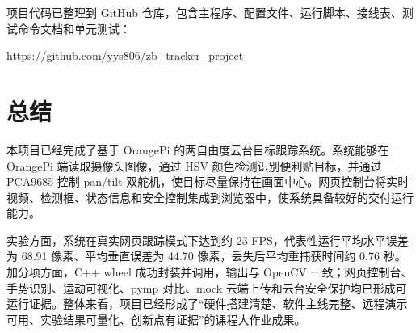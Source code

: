 \documentclass[
  oneside,
  degree=bachelor,
  field=science,
  fullwidthstop=circle,
  fontset=windows,
  times=false,
  minted=false,
  biblatex=false,
  algo=algpseudocode,
]{tongjithesis}
\begin{document}
项目代码已整理到 GitHub 仓库，包含主程序、配置文件、运行脚本、接线表、测试命令文档和单元测试：

\begin{center}
  \url{https://github.com/yys806/zb_tracker_project}
\end{center}

\chapter{总结}

本项目已经完成了基于 OrangePi 的两自由度云台目标跟踪系统。系统能够在 OrangePi 端读取摄像头图像，通过 HSV 颜色检测识别便利贴目标，并通过 PCA9685 控制 pan/tilt 双舵机，使目标尽量保持在画面中心。网页控制台将实时视频、检测框、状态信息和安全控制集成到浏览器中，使系统具备较好的交付运行能力。

实验方面，系统在真实网页跟踪模式下达到约 23 FPS，代表性运行平均水平误差为 68.91 像素、平均垂直误差为 44.70 像素，丢失后平均重捕获时间约 0.76 秒。加分项方面，C++ wheel 成功封装并调用，输出与 OpenCV 一致；网页控制台、手势识别、运动可视化、pymp 对比、mock 云端上传和云台安全保护均已形成可运行证据。整体来看，项目已经形成了“硬件搭建清楚、软件主线完整、远程演示可用、实验结果可量化、创新点有证据”的课程大作业成果。
\end{document}
